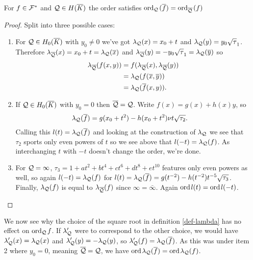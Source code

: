 \documentclass[english,11pt,a4paper]{article}
\begin{document}
\begin{lemma}\label{three}
  For $f \in \F^*$ and $\q \in \ekb$ the order satisfies $\ordq(\bar f) = \ordbq (f)$
  \begin{proof} Split into three possible cases:
    \begin{enumerate}[1.]
      \item For $\q \in \enkb$ with $y_0 \neq 0$ we've got $\lpx = x_0 + t$ and $\lpy = y_0 \sqrt \tau_1$. Therefore $\lpbx = x_0 + t = \lp (\bar x)$ and $\lpby = - y_0 \sqrt \tau_1 = \lp (\bar y)$ so
      \begin{align*}
        \lpb (f(x,y)) &= f(\lpbx , \lpby ) \\
                      &= \lp (f(\bar x, \bar y)) \\
                      &= \lp (\bar f (x,y)).
      \end{align*}

      \item If $\q \in \enkb$ with $y_0 = 0$ then $\bar \q = \q$. Write $f(x) = g(x) + h(x)y$, so
      \begin{align*}
        \lp (\bar f) &= g(x_0 + t^2) - h(x_0 + t^2) \nu t \sqrt{\tau_2}.
      \end{align*}
      Calling this $l(t) = \lp (\bar f)$ and looking at the construction of $\lp$ we see that $\tau_2$ sports only even powers of $t$ so we see above that $l(-t) = \lp (f)$. As interchanging $t$ with $-t$ doesn't change the order, we're done.

      \item For $\q = \infty$, $\tau_3 = 1 + a t^2 + b t^4 + c t^6 + d t^8 + e t^{10}$ features only even powers as well, so again $l(-t) = \lp (f)$ for $l(t) = \lp (\bar f) = g(t^{-2}) - h(t^{-2}) t^{-5} \sqrt{\tau_3}$. Finally, $\lp (f)$ is equal to $\lpb (f)$ since $\infty = \bar \infty$. Again $\ord l(t) = \ord l(-t)$.
    \end{enumerate}
  \end{proof}
\end{lemma}

\begin{remark}
  We now see why the choice of the square root in definition \ref{def-lambda} has no effect on $\ordq f$. If $\lp'$ were to correspond to the other choice, we would have $\lp'(x) = \lp(x)$ and $\lp'(y) = -\lp(y)$, so $\lp'(f) = \lp (\bar f)$. As this was under item 2 where $y_0 = 0$, meaning $\bar \q = \q$, we have $\ord \lp (\bar f) = \ord \lp(f)$.
\end{remark}
\end{document}
